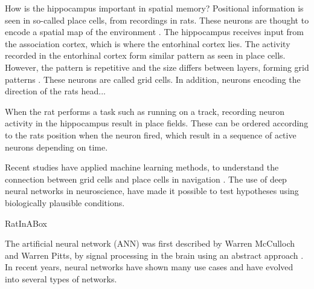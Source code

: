 How is the hippocampus important in spatial memory? Positional information is seen in so-called place cells, from recordings in rats. These neurons are thought to encode a spatial map of the environment \cite{okeefe:1978:hippocampus}. The hippocampus receives input from the association cortex, which is where the entorhinal cortex lies. The activity recorded in the entorhinal cortex form similar pattern as seen in place cells. However, the pattern is repetitive and the size differs between layers, forming grid patterns \cite{hafting:2005:microstructure}. These neurons are called grid cells. In addition, neurons encoding the direction of the rats head...

When the rat performs a task such as running on a track, recording neuron activity in the hippocampus result in place fields. These can be ordered according to the rats position when the neuron fired, which result in a sequence of active neurons depending on time.

Recent studies have applied machine learning methods, to understand the connection between grid cells and place cells in navigation \cite{banino:2018:vector_based}. The use of deep neural networks in neuroscience, have made it possible to test hypotheses using biologically plausible conditions. 




RatInABox

The artificial neural network (ANN) was first described by Warren McCulloch and Warren Pitts, by signal processing in the brain using an abstract approach \cite{mcculloch:1943:logical}. In recent years, neural networks have shown many use cases and have evolved into several types of networks.

